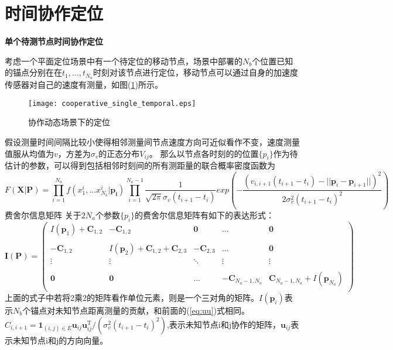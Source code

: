 \section[时间协作定位]{时间协作定位}\label{section:temporal_cooperative_localization}

\textbf{单个待测节点时间协作定位}

考虑一个平面定位场景中有一个待定位的移动节点，场景中部署的$N_b$个位置已知的锚点分别在在$t_1,\dots,t_{N_a}$时刻对该节点进行定位，移动节点可以通过自身的加速度传感器对自己的速度有测量，如图(\ref{fig:cooperative_single_temporal})所示。
        \begin{figure}
          \centering
          \texttt{[image: cooperative\_single\_temporal.eps]}
          \caption{协作动态场景下的定位}\label{fig:cooperative_single_temporal}
        \end{figure}

假设测量时间间隔比较小使得相邻测量间节点速度方向可近似看作不变，速度测量值服从均值为$v$，方差为$\sigma_{v}$的正态分布$V_{ij}$。
那么以节点各时刻的的位置$\{p_i\}$作为待估计的参数，可以得到包括相邻时刻间的所有测距量的联合概率密度函数为
\begin{equation}
F(\bm{X}|\bm{P})=\prod_{i=1}^{N_a} f(x^i_1,...x^{i}_{N_b}|\bm{p_i})
\prod_{i=1}^{N_a-1}\frac{1}{\sqrt{2\pi}\sigma_v(t_{i+1}-t_i)}
exp\left(-\frac{(v_{i,i+1}(t_{i+1}-t_i)-||\bm{p}_i-\bm{p}_{i+1}||)^2}{2\sigma_v^2(t_{i+1}-t_i)^2}\right)
\end{equation}
{费舍尔信息矩阵}
关于$2N_a$个参数$\{p_i\}$的费舍尔信息矩阵有如下的表达形式：
\begin{equation}\label{eq:time_cooperation_matrix}
\bm{I}(\bm{P})=
\left(
\begin{array}{ccccc}
I(\bm{p}_1)+\bm{C}_{1,2}&-\bm{C}_{1,2}&\bm{0}&\dots&\bm{0}\\
&&&&\\
-\bm{C}_{1,2} & I(\bm{p}_2)+\bm{C}_{1,2}+\bm{C}_{2,3}&-\bm{C}_{2,3}&\dots&\bm{0}\\
\vdots &\vdots&\ddots &\vdots&\vdots\\
&&&&\\
\bm{0}&\bm{0}&...& -\bm{C}_{N_a-1,N_a}&\bm{C}_{N_a-1,N_a}+I(\bm{p}_{N_a})\\
\end{array}
\right)
\end{equation}
上面的式子中若将2乘2的矩阵看作单位元素，则是一个三对角的矩阵。$I(\bm{p}_i)$表示$N_b$个锚点对未知节点距离测量的贡献，和前面的(\ref{eq:uu})式相同。$C_{i,i+1}=\bm{1}_{(i,j)\in E}\bm{u}_{ij}\bm{u}_{ij}^{\textrm{T}} /(\sigma_v^2(t_{i+1}-t_i)^2)$,表示未知节点i和j协作的矩阵，$\bm{u}_{ij}$表示未知节点i和j的方向向量。

